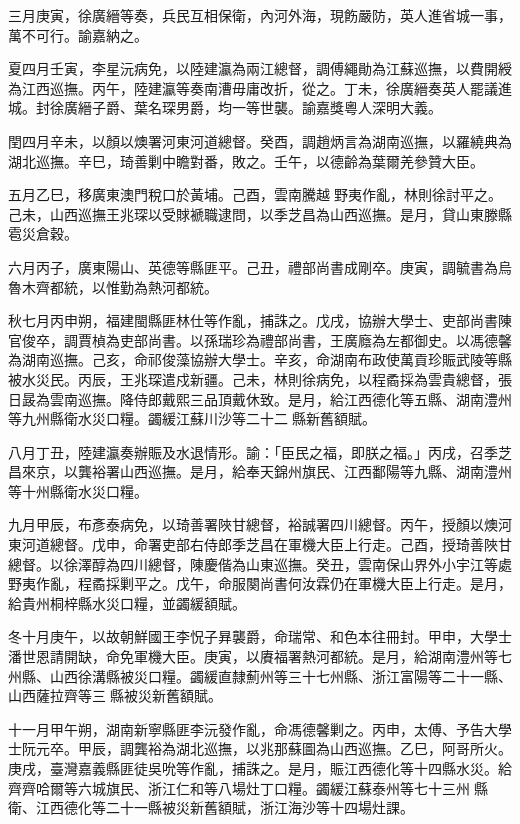 \begin{pinyinscope}
三月庚寅，徐廣縉等奏，兵民互相保衛，內河外海，現飭嚴防，英人進省城一事，萬不可行。諭嘉納之。

夏四月壬寅，李星沅病免，以陸建瀛為兩江總督，調傅繩勛為江蘇巡撫，以費開綬為江西巡撫。丙午，陸建瀛等奏南漕毋庸改折，從之。丁未，徐廣縉奏英人罷議進城。封徐廣縉子爵、葉名琛男爵，均一等世襲。諭嘉獎粵人深明大義。

閏四月辛未，以顏以燠署河東河道總督。癸酉，調趙炳言為湖南巡撫，以羅繞典為湖北巡撫。辛巳，琦善剿中瞻對番，敗之。壬午，以德齡為葉爾羌參贊大臣。

五月乙巳，移廣東澳門稅口於黃埔。己酉，雲南騰越野夷作亂，林則徐討平之。己未，山西巡撫王兆琛以受賕褫職逮問，以季芝昌為山西巡撫。是月，貸山東滕縣雹災倉穀。

六月丙子，廣東陽山、英德等縣匪平。己丑，禮部尚書成剛卒。庚寅，調毓書為烏魯木齊都統，以惟勤為熱河都統。

秋七月丙申朔，福建閩縣匪林仕等作亂，捕誅之。戊戌，協辦大學士、吏部尚書陳官俊卒，調賈楨為吏部尚書。以孫瑞珍為禮部尚書，王廣廕為左都御史。以馮德馨為湖南巡撫。己亥，命祁俊藻協辦大學士。辛亥，命湖南布政使萬貢珍賑武陵等縣被水災民。丙辰，王兆琛遣戍新疆。己未，林則徐病免，以程矞採為雲貴總督，張日晸為雲南巡撫。降侍郎戴熙三品頂戴休致。是月，給江西德化等五縣、湖南澧州等九州縣衛水災口糧。蠲緩江蘇川沙等二十二縣新舊額賦。

八月丁丑，陸建瀛奏辦賑及水退情形。諭：「臣民之福，即朕之福。」丙戌，召季芝昌來京，以龔裕署山西巡撫。是月，給奉天錦州旗民、江西鄱陽等九縣、湖南澧州等十州縣衛水災口糧。

九月甲辰，布彥泰病免，以琦善署陜甘總督，裕誠署四川總督。丙午，授顏以燠河東河道總督。戊申，命署吏部右侍郎季芝昌在軍機大臣上行走。己酉，授琦善陜甘總督。以徐澤醇為四川總督，陳慶偕為山東巡撫。癸丑，雲南保山界外小宇江等處野夷作亂，程矞採剿平之。戊午，命服闋尚書何汝霖仍在軍機大臣上行走。是月，給貴州桐梓縣水災口糧，並蠲緩額賦。

冬十月庚午，以故朝鮮國王李怳子昪襲爵，命瑞常、和色本往冊封。甲申，大學士潘世恩請開缺，命免軍機大臣。庚寅，以賡福署熱河都統。是月，給湖南澧州等七州縣、山西徐溝縣被災口糧。蠲緩直隸薊州等三十七州縣、浙江富陽等二十一縣、山西薩拉齊等三縣被災新舊額賦。

十一月甲午朔，湖南新寧縣匪李沅發作亂，命馮德馨剿之。丙申，太傅、予告大學士阮元卒。甲辰，調龔裕為湖北巡撫，以兆那蘇圖為山西巡撫。乙巳，阿哥所火。庚戌，臺灣嘉義縣匪徒吳吮等作亂，捕誅之。是月，賑江西德化等十四縣水災。給齊齊哈爾等六城旗民、浙江仁和等八場灶丁口糧。蠲緩江蘇泰州等七十三州縣衛、江西德化等二十一縣被災新舊額賦，浙江海沙等十四場灶課。


\end{pinyinscope}

